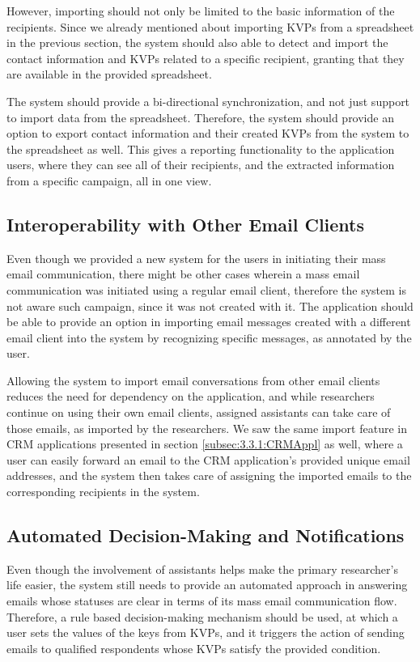 However, importing should not only be limited to the basic information of the recipients. Since we already mentioned about importing \ac{KVP}s from a spreadsheet in the previous section, the system should also able to detect and import the contact information and \ac{KVP}s related to a specific recipient, granting that they are available in the provided spreadsheet. 
\vspace{1cm}

The system should provide a bi-directional synchronization, and not just support to import data from the spreadsheet. Therefore, the system should provide an option to export contact information and their created \ac{KVP}s from the system to the spreadsheet as well. This gives a reporting functionality to the application users, where they can see all of their recipients, and the extracted information from a specific campaign, all in one view.

\subsection{Interoperability with Other Email Clients}
\label{subsec:5.1.4:InteEmaiClie}
Even though we provided a new system for the users in initiating their mass email communication, there might be other cases wherein a mass email communication was initiated using a regular email client, therefore the system is not aware such campaign, since it was not created with it. The application should be able to provide an option in importing email messages created with a different email client into the system by recognizing specific messages, as annotated by the user.
\vspace{1cm}

Allowing the system to import email conversations from other email clients reduces the need for dependency on the application, and while researchers continue on using their own email clients, assigned assistants can take care of those emails, as imported by the researchers. We saw the same import feature in \ac{CRM} applications presented in section \ref{subsec:3.3.1:CRMAppl} as well, where a user can easily forward an email to the \ac{CRM} application's provided unique email addresses, and the system then takes care of assigning the imported emails to the corresponding recipients in the system.

\subsection{Automated Decision-Making and Notifications}
\label{subsec:5.1.5:AutoDeciMakiNoti}
Even though the involvement of assistants helps make the primary researcher's life easier, the system still needs to provide an automated approach in answering emails whose statuses are clear in terms of its mass email communication flow. Therefore, a rule based decision-making mechanism should be used, at which a user sets the values of the keys from \ac{KVP}s, and it triggers the action of sending emails to qualified respondents whose \ac{KVP}s satisfy the provided condition.
\vspace{1cm}

